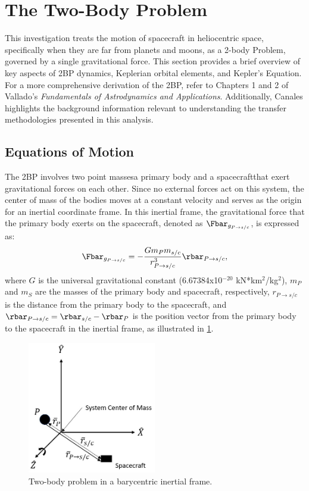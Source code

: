 \section{The Two-Body Problem}
This investigation treats the motion of spacecraft in heliocentric space, specifically when they
are far from planets and moons, as a 2-body Problem, governed by a single gravitational force. This
section provides a brief overview of key aspects of 2BP dynamics, Keplerian orbital elements, and
Kepler's Equation. For a more comprehensive derivation of the 2BP, refer to Chapters 1 and 2 of
Vallado's \emph{Fundamentals of Astrodynamics and Applications}\cite{Vallado:2013}. Additionally,
Canales highlights the background information relevant to understanding the transfer methodologies
presented in this analysis\cite{Canales:2021b}.

\subsection{Equations of Motion}
The 2BP involves two point masses\textemdash a primary body and a spacecraft\textemdash that exert
gravitational forces on each other. Since no external forces act on this system, the center of mass
of the bodies moves at a constant velocity and serves as the origin for an inertial coordinate
frame. In this inertial frame, the gravitational force that the primary body exerts on the
spacecraft, denoted as $\Fbar_{g_{P\rightarrow s/c}}$, is expressed as:
\begin{equation}
    \Fbar_{g_{P\rightarrow s/c}}=-\frac{Gm_{P}m_{s/c}}{r_{P\rightarrow s/c}^{3}}\rbar_{P\rightarrow s/c},
    \label{eq:gravity}
\end{equation}
where $G$ is the universal gravitational constant (6.67384x10$^{-20}$ kN*km$^{2}$/kg$^{2}$),
$m_{P}$ and $m_{S}$ are the masses of the primary body and spacecraft, respectively,
$r_{P\rightarrow s/c}$ is the distance from the primary body to the spacecraft, and
$\rbar_{P\rightarrow s/c}=\rbar_{s/c}-\rbar_{P}$ is the position vector from the primary body to
the spacecraft in the inertial frame, as illustrated in \cref{fig:2BP}.

\begin{figure}[ht]
    \centering
    \includegraphics[width=0.5\textwidth]{figures/TBP.jpg}
    \caption{Two-body problem in a barycentric inertial frame.}
    \label{fig:2BP}
\end{figure}

